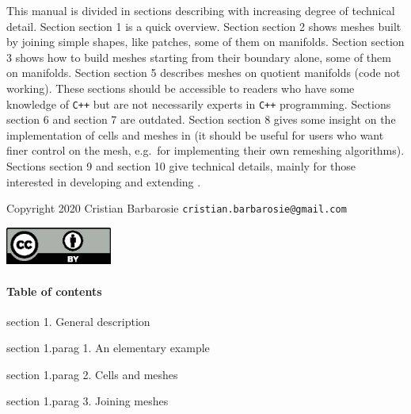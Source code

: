 This manual is divided in sections describing {\maniFEM} with increasing degree of technical
detail.
Section \numb section 1 is a quick overview.
Section \numb section 2 shows meshes built by joining simple shapes, like patches,
some of them on manifolds.
Section \numb section 3 shows how to build meshes starting from their boundary alone,
some of them on manifolds.
Section \numb section 5 describes meshes on quotient manifolds (code not working).
These sections should be accessible to readers who have some knowledge of {\tt C++}
but are not necessarily experts in {\tt C++} programming.
Sections \numb section 6 and \numb section 7 are outdated.
Section \numb section 8 gives some insight on the implementation of cells and meshes in
{\maniFEM} (it should be useful for users who want finer control on the mesh,
e.g.~for implementing their own remeshing algorithms).
Sections \numb section 9 and \numb section 10 give technical details, mainly for those
interested in developing and extending \maniFEM.
\bigskip

\noindent
Copyright 2020 Cristian Barbarosie {\tt cristian.barbarosie@gmail.com}
\bigskip

\noindent
\includegraphics[width=35mm]{common-creatives-by.eps}\hskip5mm
\raise 9mm\hbox{}
\bigskip\bigskip
\vfil\eject



\paragraph{Table of contents}

\bigskip\noindent
\numb section 1. General description

\numb section 1.\numb parag 1. An elementary example

\numb section 1.\numb parag 2. Cells and meshes

\numb section 1.\numb parag 3. Joining meshes

